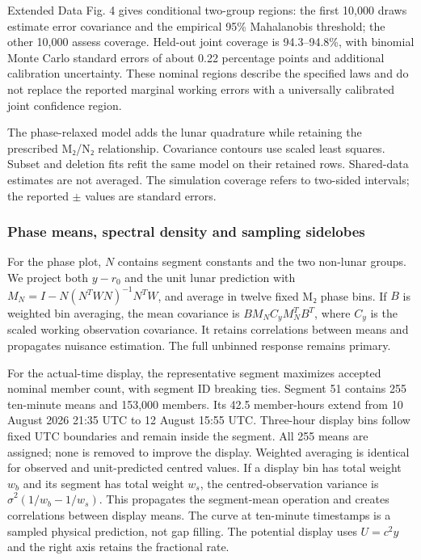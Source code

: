 \documentclass[
  12pt,
  a4paper,
]{article}
\begin{document}
Extended Data Fig. 4 gives conditional two-group regions: the first
10,000 draws estimate error covariance and the empirical 95\%
Mahalanobis threshold; the other 10,000 assess coverage. Held-out joint
coverage is 94.3--94.8\%, with binomial Monte Carlo standard errors of
about 0.22 percentage points and additional calibration uncertainty.
These nominal regions describe the specified laws and do not replace the
reported marginal working errors with a universally calibrated joint
confidence region.

The phase-relaxed model adds the lunar quadrature while retaining the
prescribed M₂/N₂ relationship. Covariance contours use scaled least
squares. Subset and deletion fits refit the same model on their retained
rows. Shared-data estimates are not averaged. The simulation coverage
refers to two-sided intervals; the reported \(\pm\) values are standard
errors.

\hypertarget{phase-means-spectral-density-and-sampling-sidelobes}{%
\subsubsection{Phase means, spectral density and sampling
sidelobes}\label{phase-means-spectral-density-and-sampling-sidelobes}}

For the phase plot, \(N\) contains segment constants and the two
non-lunar groups. We project both \(y-r_0\) and the unit lunar
prediction with \(M_N=I-N(N^TWN)^{-1}N^TW\), and average in twelve fixed
M₂ phase bins. If \(B\) is weighted bin averaging, the mean covariance
is \(BM_NC_yM_N^TB^T\), where \(C_y\) is the scaled working observation
covariance. It retains correlations between means and propagates
nuisance estimation. The full unbinned response remains primary.

For the actual-time display, the representative segment maximizes
accepted nominal member count, with segment ID breaking ties. Segment 51
contains 255 ten-minute means and 153,000 members. Its 42.5 member-hours
extend from 10 August 2026 21:35 UTC to 12 August 15:55 UTC. Three-hour
display bins follow fixed UTC boundaries and remain inside the segment.
All 255 means are assigned; none is removed to improve the display.
Weighted averaging is identical for observed and unit-predicted centred
values. If a display bin has total weight \(w_b\) and its segment has
total weight \(w_s\), the centred-observation variance is
\(\widehat\sigma^2(1/w_b-1/w_s)\). This propagates the segment-mean
operation and creates correlations between display means. The curve at
ten-minute timestamps is a sampled physical prediction, not gap filling.
The potential display uses \(U=c^2y\) and the right axis retains the
fractional rate.
\end{document}

